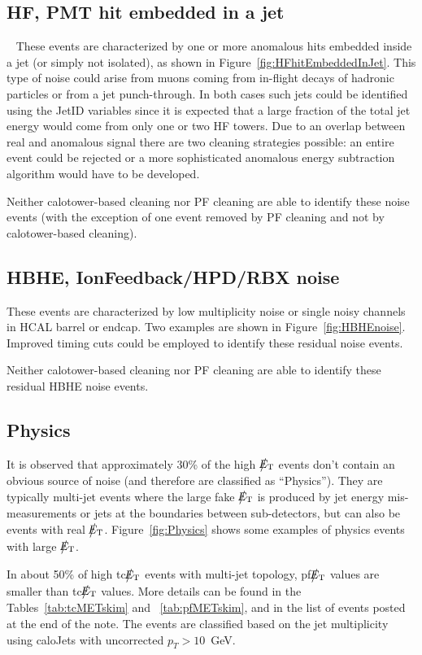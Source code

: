 \subsection{HF, PMT hit embedded in a jet} ~\label{sec:HFHitEmbeddedInJet}
These events are characterized by one or more anomalous hits embedded inside a jet (or simply not isolated), 
as shown in Figure~\ref{fig:HFhitEmbeddedInJet}. This type of noise could arise from muons coming from 
in-flight decays of hadronic particles or from a jet punch-through. In both cases
such jets could be identified using the JetID variables since it is expected that a large fraction of the
total jet energy would come from only one or two HF towers. Due to an overlap between real and anomalous signal there are
two cleaning strategies possible: an entire event could be rejected or a more sophisticated anomalous energy
subtraction algorithm would have to be developed.

Neither calotower-based cleaning nor PF cleaning are able to identify these noise events 
(with the exception of one event removed by PF cleaning and not by calotower-based cleaning).

\subsection{HBHE, IonFeedback/HPD/RBX noise}
These events are characterized by low multiplicity noise or single noisy channels in HCAL barrel or endcap.
Two examples are shown in Figure~\ref{fig:HBHEnoise}.
Improved timing cuts could be employed to identify these residual noise events.

Neither calotower-based cleaning nor PF cleaning are able to identify these residual HBHE noise events.

\subsection{Physics}
It is observed that approximately 30\% of the high $\big\slash\hspace{-1.6ex}{E_\text{T}}$ events don't contain an obvious source of noise
(and therefore are classified as ``Physics''). They are typically multi-jet events where 
the large fake $\big\slash\hspace{-1.6ex}{E_\text{T}}$ is produced by jet energy mis-measurements or jets at the boundaries between sub-detectors, 
but can also be events with real $\big\slash\hspace{-1.6ex}{E_\text{T}}$. Figure~\ref{fig:Physics} 
shows some examples of physics events with large $\big\slash\hspace{-1.6ex}{E_\text{T}}$. 

In about 50\% of high tc$\big\slash\hspace{-1.6ex}{E_\text{T}}$ events with multi-jet topology, pf$\big\slash\hspace{-1.6ex}{E_\text{T}}$ values are 
smaller than tc$\big\slash\hspace{-1.6ex}{E_\text{T}}$ values. More details can be found in 
the Tables~\ref{tab:tcMETskim} and ~\ref{tab:pfMETskim}, and in the list of events posted at the end of the note.
The events are classified based on the jet multiplicity using caloJets with uncorrected $p_T>10$~GeV.

